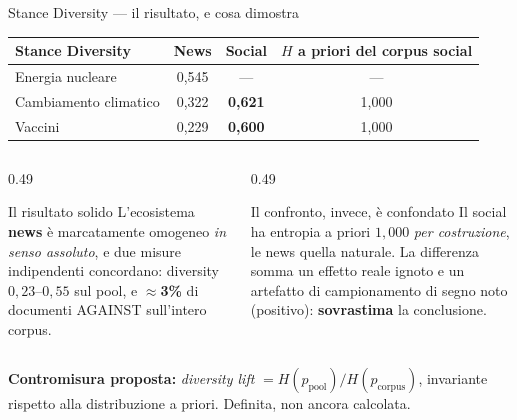\documentclass[aspectratio=169,11pt]{beamer}
\begin{document}
\begin{frame}{Stance Diversity --- il risultato, e cosa dimostra}
  \centering\small
  \begin{tabular}{lccc}
    \toprule
    \textbf{Stance Diversity} & \textbf{News} & \textbf{Social} & $H$ a priori del corpus social \\
    \midrule
    Energia nucleare      & 0,545 & --- & --- \\
    Cambiamento climatico & 0,322 & \textbf{0,621} & 1,000 \\
    Vaccini               & 0,229 & \textbf{0,600} & 1,000 \\
    \bottomrule
  \end{tabular}
  \vspace{0.6em}
  \begin{columns}[T]
    \begin{column}{0.49\textwidth}
      \begin{block}{\small Il risultato solido}
        \scriptsize
        L'ecosistema \textbf{news} è marcatamente omogeneo \emph{in senso assoluto}, e due
        misure indipendenti concordano: diversity $0{,}23$--$0{,}55$ sul pool, e
        $\approx$\textbf{3\%} di documenti AGAINST sull'intero corpus.
      \end{block}
    \end{column}
    \begin{column}{0.49\textwidth}
      \begin{alertblock}{\small Il confronto, invece, è confondato}
        \scriptsize
        Il social ha entropia a priori $1{,}000$ \emph{per costruzione}, le news quella
        naturale. La differenza somma un effetto reale ignoto e un artefatto di
        campionamento di segno noto (positivo): \textbf{sovrastima} la conclusione.
      \end{alertblock}
    \end{column}
  \end{columns}
  \vspace{0.3em}
  {\footnotesize\textbf{Contromisura proposta:} \emph{diversity lift} $=
  H(p_{\text{pool}})/H(p_{\text{corpus}})$, invariante rispetto alla distribuzione a priori.
  Definita, non ancora calcolata.}
\end{frame}
\end{document}
